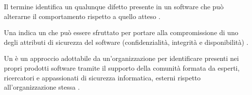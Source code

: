 \begin{definizione}[\Bug]
Il termine \bug identifica un qualunque difetto presente in un software che può alterarne il comportamento rispetto a quello atteso \cite{fryer2017bugbounty, bettini2021tdd15}.
\end{definizione}

\begin{definizione}[\Vulnerability]
Una \vulnerability indica un \bug che può essere sfruttato per portare alla compromissione di uno degli attributi di sicurezza del software (confidenzialità, integrità e disponibilità) \cite{fryer2017bugbounty, mitropoulos2017securing}.
\end{definizione}




\begin{definizione}
Un \CVD è un approccio adottabile da un'organizzazione per identificare \vulnerability presenti nei propri prodotti software tramite il supporto della comunità formata da esperti, ricercatori e appassionati di sicurezza informatica, esterni rispetto all'organizzazione stessa \cite{walshe2023bountythesis2, walshe2022cvdpaper}.
\end{definizione}



